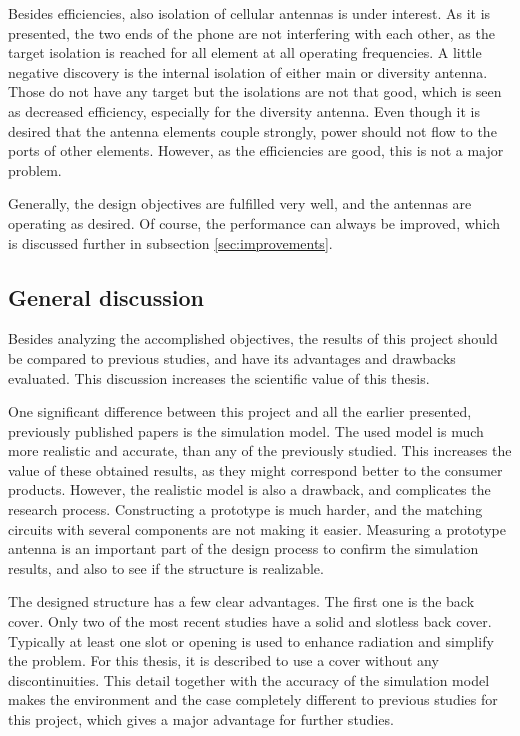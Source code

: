 Besides efficiencies, also isolation of cellular antennas is under interest. As it is presented, the two ends of the phone are not interfering with each other, as the target isolation is reached for all element at all operating frequencies. A little negative discovery is the internal isolation of either main or diversity antenna. Those do not have any target but the isolations are not that good, which is seen as decreased efficiency, especially for the diversity antenna. Even though it is desired that the antenna elements couple strongly, power should not flow to the ports of other elements. However, as the efficiencies are good, this is not a major problem.

Generally, the design objectives are fulfilled very well, and the antennas are operating as desired. Of course, the performance can always be improved, which is discussed further in subsection \ref{sec:improvements}.


\subsection{General discussion}
\label{sec:general_discussion}
Besides analyzing the accomplished objectives, the results of this project should be compared to previous studies, and have its advantages and drawbacks evaluated. This discussion increases the scientific value of this thesis.

One significant difference between this project and all the earlier presented, previously published papers is the simulation model. The used model is much more realistic and accurate, than any of the previously studied. This increases the value of these obtained results, as they might correspond better to the consumer products. However, the realistic model is also a drawback, and complicates the research process. Constructing a prototype is much harder, and the matching circuits with several components are not making it easier. Measuring a prototype antenna is an important part of the design process to confirm the simulation results, and also to see if the structure is realizable.

The designed structure has a few clear advantages. The first one is the back cover. Only two of the most recent studies have a solid and slotless back cover. Typically at least one slot or opening is used to enhance radiation and simplify the problem. For this thesis, it is described to use a cover without any discontinuities. This detail together with the accuracy of the simulation model makes the environment and the case completely different to previous studies for this project, which gives a major advantage for further studies. 

